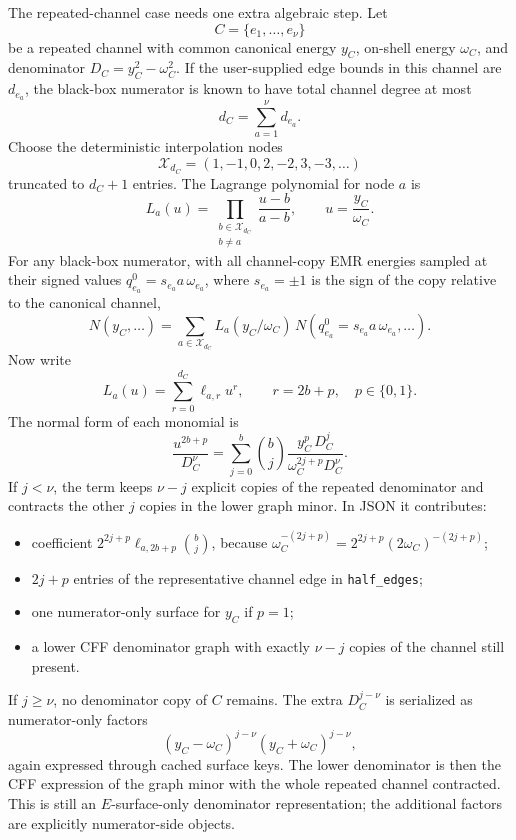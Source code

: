 \documentclass[11pt,a4paper]{report}
\newcommand{\Samples}{\mathcal X}
\begin{document}
The repeated-channel case needs one extra algebraic step.  Let
\[
  C=\{e_1,\ldots,e_\nu\}
\]
be a repeated channel with common canonical energy \(y_C\), on-shell energy
\(\omega_C\), and denominator \(D_C=y_C^2-\omega_C^2\).  If the user-supplied
edge bounds in this channel are \(d_{e_a}\), the black-box numerator is known
to have total channel degree at most
\[
  d_C=\sum_{a=1}^{\nu}d_{e_a}.
\]
Choose the deterministic interpolation nodes
\[
  \Samples_{d_C}=(1,-1,0,2,-2,3,-3,\ldots)
\]
truncated to \(d_C+1\) entries.  The Lagrange polynomial for node \(a\) is
\[
  L_a(u)=\prod_{\substack{b\in\Samples_{d_C}\\ b\ne a}}
  \frac{u-b}{a-b},\qquad u=\frac{y_C}{\omega_C}.
\]
For any black-box numerator, with all channel-copy EMR energies sampled at
their signed values \(q_{e_a}^0=s_{e_a}a\,\omega_{e_a}\), where
\(s_{e_a}=\pm1\) is the sign of the copy relative to the canonical channel,
\[
  N(y_C,\ldots)
  =
  \sum_{a\in\Samples_{d_C}}
  L_a(y_C/\omega_C)\,
  N\!\left(q_{e_a}^0=s_{e_a}a\,\omega_{e_a},\ldots\right).
  \label{eq:channel-interpolation}
\]
Now write
\[
  L_a(u)=\sum_{r=0}^{d_C}\ell_{a,r}u^r,\qquad
  r=2b+p,\quad p\in\{0,1\}.
\]
The normal form of each monomial is
\begin{equation}
  \frac{u^{2b+p}}{D_C^\nu}
  =
  \sum_{j=0}^{b}
  \binom{b}{j}
  \frac{y_C^{p}\,D_C^j}
       {\omega_C^{2j+p}D_C^\nu}.
  \label{eq:channel-normal-form}
\end{equation}
If \(j<\nu\), the term keeps \(\nu-j\) explicit copies of the repeated
denominator and contracts the other \(j\) copies in the lower graph minor.  In
JSON it contributes:
\begin{itemize}[leftmargin=2em]
  \item coefficient \(2^{2j+p}\ell_{a,2b+p}\binom{b}{j}\), because
        \(\omega_C^{-(2j+p)}=2^{2j+p}(2\omega_C)^{-(2j+p)}\);
  \item \(2j+p\) entries of the representative channel edge in
        \texttt{half\_edges};
  \item one numerator-only surface for \(y_C\) if \(p=1\);
  \item a lower CFF denominator graph with exactly \(\nu-j\) copies of the
        channel still present.
\end{itemize}
If \(j\ge\nu\), no denominator copy of \(C\) remains.  The extra
\(D_C^{j-\nu}\) is serialized as numerator-only factors
\[
  (y_C-\omega_C)^{j-\nu}(y_C+\omega_C)^{j-\nu},
\]
again expressed through cached surface keys.  The lower denominator is then the
CFF expression of the graph minor with the whole repeated channel contracted.
This is still an \(E\)-surface-only denominator representation; the additional
factors are explicitly numerator-side objects.
\end{document}
